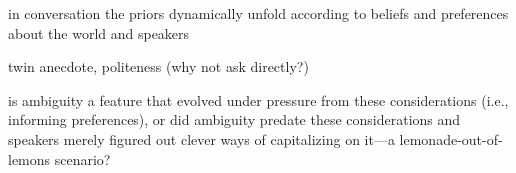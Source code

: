 \documentclass[10pt,a4paper]{article}
\begin{document}
in conversation the priors dynamically unfold according to beliefs and preferences about the world and speakers

twin anecdote, politeness (why not ask directly?)

is ambiguity a feature that evolved under pressure from these considerations (i.e., informing preferences), or did ambiguity predate these considerations and speakers merely figured out clever ways of capitalizing on it---a lemonade-out-of-lemons scenario?


\setlength{\bibleftmargin}{.125in}
\setlength{\bibindent}{-\bibleftmargin}


\end{document}
